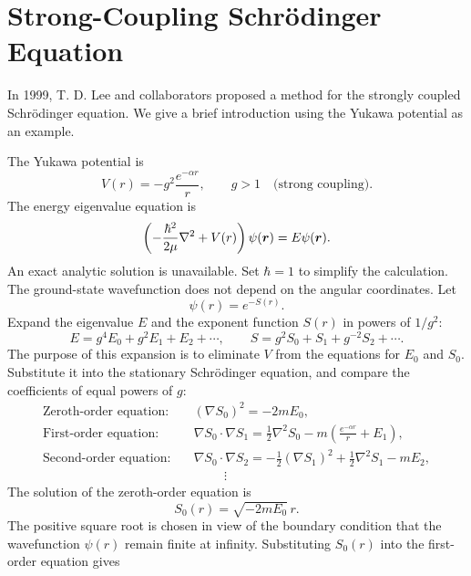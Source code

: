 \section{Strong-Coupling Schr\"odinger Equation}
In 1999, T. D. Lee and collaborators proposed a method for the strongly coupled Schr\"odinger equation. We give a brief introduction using the Yukawa potential as an example.

The Yukawa potential is
\begin{equation}
 V(r)=-g^2\frac{e^{-\alpha r}}{r},\qquad g>1\quad\text{(strong coupling)}.
\end{equation}
The energy eigenvalue equation is
\begin{equation}
 \left(-\frac{\hbar^2}{2\mu}\nabla^2+V(r)\right)
 \psi(\bm{r})=E\psi(\bm{r}).
\end{equation}
An exact analytic solution is unavailable. Set $\hbar=1$ to simplify the calculation. The ground-state wavefunction does not depend on the angular coordinates. Let
\begin{equation}
 \psi(r)=e^{-S(r)}.
\end{equation}
Expand the eigenvalue $E$ and the exponent function $S(r)$ in powers of $1/g^2$:
\begin{equation}
 E=g^4E_0+g^2E_1+E_2+\cdots,\qquad
 S=g^2S_0+S_1+g^{-2}S_2+\cdots.
\end{equation}
The purpose of this expansion is to eliminate $V$ from the equations for $E_0$ and $S_0$. Substitute it into the stationary Schr\"odinger equation, and compare the coefficients of equal powers of $g$:
\begin{equation}\begin{aligned}
 \text{Zeroth-order equation:}\quad
 &(\nabla S_0)^2=-2mE_0,\\
 \text{First-order equation:}\quad
 &\nabla S_0\cdot\nabla S_1
 =\frac12\nabla^2S_0-m\left(\frac{e^{-\alpha r}}r+E_1\right),\\
 \text{Second-order equation:}\quad
 &\nabla S_0\cdot\nabla S_2
 =-\frac12(\nabla S_1)^2+\frac12\nabla^2S_1-mE_2,\\
 &\hspace{1cm}\vdots
\end{aligned}\end{equation}
The solution of the zeroth-order equation is
\begin{equation}
 S_0(r)=\sqrt{-2mE_0}\,r.
\end{equation}
The positive square root is chosen in view of the boundary condition that the wavefunction $\psi(r)$ remain finite at infinity. Substituting $S_0(r)$ into the first-order equation gives
